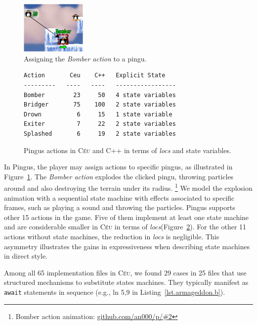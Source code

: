 \documentclass[10pt, conference, compsocconf]{IEEEtran}
\newcommand{\CEU}{\textsc{C\'{e}u}\xspace}
\newcommand{\locs}{\emph{locs}\xspace}
\newcommand{\code}[1] {{\small{\texttt{#1}}}}
\begin{document}
\begin{figure}
\centering
\includegraphics[width=120px]{bomber-01}
\caption{ Assigning the \emph{Bomber action} to a pingu.
\label{fig.bomber.action}
}
\end{figure}

\begin{figure}
{\footnotesize
\begin{verbatim}
Action       Ceu    C++   Explicit State
---------   ----   ----   -----------------
Bomber        23     50   4 state variables
Bridger       75    100   2 state variables
Drown          6     15   1 state variable
Exiter         7     22   2 state variables
Splashed       6     19   2 state variables
\end{verbatim}
\caption{Pingus actions in \CEU and C++ in terms of \locs and state variables.
\label{tab.actions}
}
}
\end{figure}

In Pingus, the player may assign actions to specific pingus, as illustrated in
Figure~\ref{fig.bomber.action}.
%
The \emph{Bomber action} explodes the clicked pingu, throwing particles around
and also destroying the terrain under its radius.%
\footnote{Bomber action animation: \url{github.com/an000/p/#2} }
%
We model the explosion animation with a sequential state machine with effects
associated to specific frames, such as playing a sound and throwing the
particles.
%
Pingus supports other 15 actions in the game.
Five of them implement at least one state machine and are considerable smaller
in \CEU in terms of \locs (Figure~\ref{tab.actions}).
%
For the other 11 actions without state machines, the reduction in \locs is
negligible.
%
This asymmetry illustrates the gains in expressiveness when describing state
machines in direct style.


Among all 65 implementation files in \CEU, we found 29 cases in 25 files that
use structured mechanisms to substitute states machines.
They typically manifest as \code{await} statements in sequence (e.g.,
ln 5,9 in Listing~\ref{lst.armageddon.b}).
\end{document}
